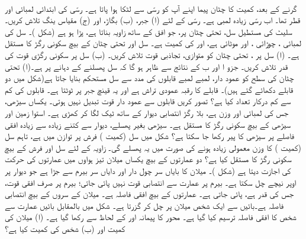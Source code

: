 \\
گرنے کے بعد،  کمیت کا  چٹان پیما اپنے آپ کو رسّی سے لٹکا ہوا پاتا ہے۔ رسّی کی ابتدائی لمبائی  اور 
قطر  تھا۔ اب رسّی  زیادہ لمبی ہے۔ رسّی کے لئے   (ا)  جبر، (ب) بگاڑ، اور (ج) مقیاس ینگ تلاش کریں۔
سلیٹ  کی مستطیل  سل، تحتی چٹان پر،   جو افق کے ساتھ  زاویہ بناتا ہے، پڑا ہو ہے (شکل )۔ سل
 کی لمبائی ، چوڑائی ، اور   موٹائی  ہے،  اور    کی کمیت  ہے۔ سل اور تحتی  چٹان کے بیچ سکونی رگڑ کا مستقل  ہے۔ (ا)  سل پر ، تحتی چٹان کو متوازی،  تجاذبی قوت تلاش کریں۔ (ب)  سل پر سکونی رگڑی قوت کی قدر  تلاش کریں۔ جزو ا اور ب کے نتائج سے ظاہر ہو گا کہ سل پھسلنے کے دہانے پر ہے۔(ا)  تحتی چٹان کی سطح کو عمود دار،  لمبے لمبے قابلوں کی مدد سے  سل مستحکم بنایا جاتا ہے(شکل  میں دو قابلے دکھائے گئے ہیں)۔  قابلے  کا رقبہ عمودی تراش  ہے اور  یہ   قینچ   جبر پر  ٹوٹتا ہے۔ قابلوں کی کم سے کم درکار تعداد کیا ہے؟ تصور کریں قابلوں سے عمود دار قوت تبدیل نہیں ہوتی۔
یکساں سیڑھی، جس کی لمبائی  اور وزن  ہے، بلا رگڑ انتصابی دیوار کے ساتھ ٹیک لگا کر کھڑی ہے۔ استوا زمین اور سیڑھی  کے بیچ سکونی رگڑ کا مستقل   ہے۔ سیڑھی بغیر پھسلے، دیوار سے کتنے زیادہ سے زیادہ  افقی فاصلے پر سیڑھی   کا پیر رکھا جا سکتا ہے؟
شکل  میں سل  (کمیت )  فرش پر توازن میں ہے، تاہم سل  (کمیت ) کا وزن معمولی   زیادہ ہونے کی صورت میں یہ پھسلے گی۔ زاویہ  کے لئے سل  اور   فرش کے بیچ سکونی رگڑ کا مستقل کیا ہے؟
دو عمارتوں کے بیچ  یکساں    میلان تیز ہواوں   میں عمارتوں کی حرکت کی اجازت دیتا ہے (شکل )۔  میلان کا بایاں سر چول دار  اور  دایاں سر  بیرم  سے جڑا ہے جو دیوار پر اوپر نیچے چل سکتا ہے۔ بیرم پر عمارت سے انتصابی قوت نہیں پائی جاتی؛  بیرم  پر صرف افقی قوت، جس کی قدر  ہے، پائی جاتی ہے۔ عمارتوں کے بیچ افقی فاصلہ  ہے۔ میلان  کے سروں کے بیچ انتصابی فاصلہ  ہے۔بائیں سے  ایک شخص  میلان پر  چل کر گزرتا ہے۔ شکل  میں  بالمقابل  بائیں عمارت سے شخص کا افقی فاصلہ  ترسیم کیا گیا ہے۔ محور  کا پیمانہ   اور  کے لحاظ سے رکھا گیا ہے۔ (ا) میلان کی کمیت اور (ب) شخص کی کمیت کیا ہے؟
